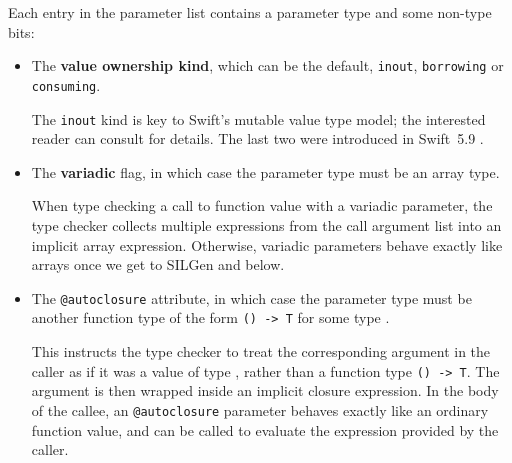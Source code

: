 \documentclass[../generics]{subfiles}
\begin{document}
Each entry in the parameter list contains a parameter type and some non-type bits:
\begin{itemize}
\item The \textbf{value ownership kind}, which can be the default, \texttt{inout}, \texttt{borrowing} or \texttt{consuming}.

The \texttt{inout} kind is key to Swift's mutable value type model; the interested reader can consult \cite{valuesemantics} for details. The last two were introduced in Swift~5.9 \cite{se0377}.

\item The \textbf{variadic} flag, in which case the parameter type must be an array type.

When type checking a call to function value with a variadic parameter, the type checker collects multiple expressions from the call argument list into an implicit array expression. Otherwise, variadic parameters behave exactly like arrays once we get to SILGen and below.
\item The \texttt{@autoclosure} attribute, in which case the parameter type must be another function type of the form \verb|() -> T| for some type \tT.

This instructs the type checker to treat the corresponding argument in the caller as if it was a value of type \tT, rather than a function type \verb|() -> T|. The argument is then wrapped inside an implicit closure expression. In the body of the callee, an \texttt{@autoclosure} parameter behaves exactly like an ordinary function value, and can be called to evaluate the expression provided by the caller.
\end{itemize}
\end{document}
